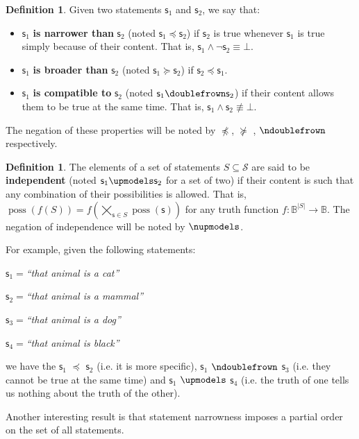 \documentclass[letterpaper]{article}
\theoremstyle{plain}%
\theoremstyle{definition}
\newtheorem{defn}[thrm]{Definition}
\theoremstyle{remark}
\numberwithin{equation}{section}
\DeclareMathOperator{\possFn}{poss}
\def\contradiction{\bot}
\def\comp{\doublefrown}
\def\ncomp{\ndoublefrown}
\def\narrower{\preccurlyeq}
\def\nnarrower{\npreccurlyeq}
\def\broader{\succcurlyeq}
\def\nbroader{\nsucccurlyeq}
\def\indep{\upmodels}
\def\nindep{\nupmodels}
\def\AND{\wedge}
\def\NOT{\neg}
\newcommand{\stmt}[1][s] {\mathsf{#1}}
\newcommand{\statement}[1] {\emph{``#1''}}
\begin{document}
\begin{defn}
	Given two statements $\stmt_1$ and $\stmt_2$, we say that:
	\begin{itemize}
		\item $\stmt_1$ \textbf{is narrower than} $\stmt_2$ (noted $\stmt_1 \narrower \stmt_2$) if $\stmt_2$ is true whenever $\stmt_1$ is true simply because of their content. That is, $\stmt_1 \AND \NOT \stmt_2 \equiv \contradiction$.
		\item $\stmt_1$ \textbf{is broader than} $\stmt_2$ (noted $\stmt_1 \broader \stmt_2$) if $\stmt_2 \narrower \stmt_1$.
		\item $\stmt_1$ \textbf{is compatible to} $\stmt_2$ (noted $\stmt_1 \comp \stmt_2$) if their content allows them to be true at the same time. That is, $\stmt_1 \AND \stmt_2 \nequiv \contradiction$.
		
	\end{itemize}
	The negation of these properties will be noted by $\nnarrower$, $\nbroader$ , $\ncomp$ respectively.
\end{defn}
\begin{defn}
	The elements of a set of statements $S \subseteq \mathcal{S}$ are said to be \textbf{independent} (noted $\stmt_1 \indep \stmt_2$ for a set of two) if their content is such that any combination of their possibilities is allowed. That is, $\possFn(f(S)) = f(\bigtimes\limits_{\stmt \in S} \possFn(\stmt))$ for any truth function $f : \mathbb{B}^{|S|} \to \mathbb{B}$. The negation of independence will be noted by $\nindep$.
\end{defn}

For example, given the following statements:
\begin{description}
	\item $\stmt_1=$\statement{that animal is a cat}
	\item $\stmt_2=$\statement{that animal is a mammal}
	\item $\stmt_3=$\statement{that animal is a dog}
	\item $\stmt_4=$\statement{that animal is black}
\end{description}
we have the $\stmt_1$ $\narrower$ $\stmt_2$ (i.e. it is more specific), $\stmt_1$ $\ncomp$ $\stmt_3$ (i.e. they cannot be true at the same time) and $\stmt_1$ $\indep$ $\stmt_4$ (i.e. the truth of one tells us nothing about the truth of the other).

Another interesting result is that statement narrowness imposes a partial order on the set of all statements.
\end{document}
